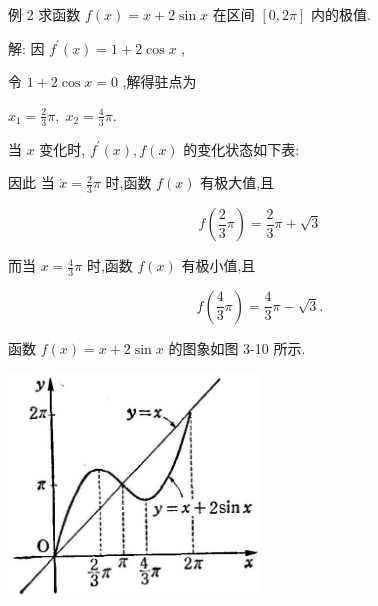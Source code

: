 \documentclass[10pt]{article}
\begin{document}
例 2 求函数 \(f\left( x\right) = x + 2\sin x\) 在区间 \(\left\lbrack {0,{2\pi }}\right\rbrack\) 内的极值.

解: 因 \({f}^{\prime }\left( x\right) = 1 + 2\cos x\) ,

令 \(1 + 2\cos x = 0\) ,解得驻点为

\({x}_{1} = \frac{2}{3}\pi ,\;{x}_{2} = \frac{4}{3}\pi .\)

当 \(x\) 变化时, \({f}^{\prime }\left( x\right) ,f\left( x\right)\) 的变化状态如下表:

\begin{center}
\end{center}

因此 当 \(\dot{x} = \frac{2}{3}\pi\) 时,函数 \(f\left( x\right)\) 有极大值,且

\[
f\left( {\frac{2}{3}\pi }\right) = \frac{2}{3}\pi + \sqrt{3}
\]

而当 \(x = \frac{4}{3}\pi\) 时,函数 \(f\left( x\right)\) 有极小值,且

\[
f\left( {\frac{4}{3}\pi }\right) = \frac{4}{3}\pi - \sqrt{3}.
\]

函数 \(f\left( x\right) = x + 2\sin x\) 的图象如图 3-10 所示.

\begin{center}
\includegraphics[max width=0.5\textwidth]{images/01912c18-5c3f-733d-b775-749ba9897a9d_144_191268.jpg}
\end{center}
\end{document}
